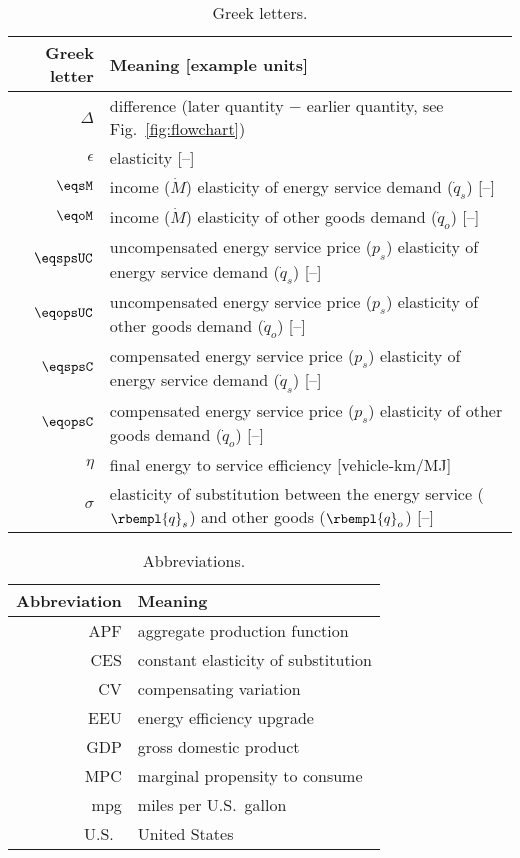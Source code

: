 
\begin{table}
\centering %
\caption{Greek letters.}
\begin{tabular}{r l}
  \toprule
  Greek letter & Meaning [example units] \\
  \midrule
  $\Delta$   & difference (later quantity $-$ earlier quantity, see Fig.~\ref{fig:flowchart}) \\
  $\epsilon$ & elasticity [--] \\
  $\eqsM$    & income ($\dot{M}$) elasticity of energy service demand ($\dot{q}_s$) [--] \\
  $\eqoM$    & income ($\dot{M}$) elasticity of other goods demand ($\dot{q}_o$) [--] \\
  $\eqspsUC$ & uncompensated energy service price ($p_s$) elasticity of energy service demand ($\dot{q}_s$) [--] \\
  $\eqopsUC$ & uncompensated energy service price ($p_s$) elasticity of other goods demand ($\dot{q}_o$) [--] \\
  $\eqspsC$   & compensated energy service price ($p_s$) elasticity of energy service demand ($\dot{q}_s$) [--] \\
  $\eqopsC$   & compensated energy service price ($p_s$) elasticity of other goods demand ($\dot{q}_o$) [--] \\
  $\eta$     & final energy to service efficiency [vehicle-km/MJ] \\
  $\sigma$   & elasticity of substitution between the energy service ($\rbempl{q}_s$) and other goods ($\rbempl{q}_o$) [--] \\
  \bottomrule
\end{tabular}
\label{tab:greek}
\end{table}



\begin{table}
\centering %
\caption{Abbreviations.}
\begin{tabular}{r l}
  \toprule
  Abbreviation & Meaning \\
  \midrule
  APF & aggregate production function \\
  CES & constant elasticity of substitution \\
  CV & compensating variation \\
  EEU & energy efficiency upgrade \\
  GDP & gross domestic product \\
  MPC & marginal propensity to consume \\
  mpg & miles per U.S.\ gallon \\
  U.S.\ & United States \\
  \bottomrule
\end{tabular}
\label{tab:abbreviations}
\end{table}


